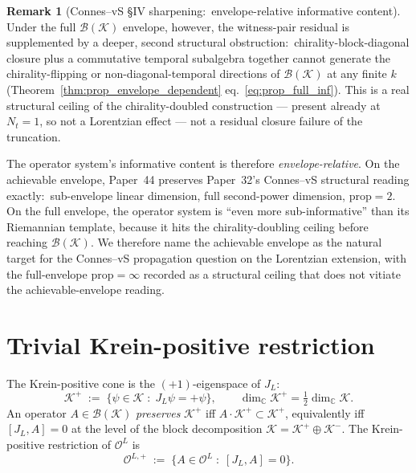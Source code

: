 \documentclass[11pt,a4paper]{article}
\theoremstyle{plain}
\theoremstyle{definition}
\newtheorem{remark}[theorem]{Remark}
\newcommand{\Nt}{N_t}
\newcommand{\Krein}{\mathcal{K}}
\newcommand{\Op}{\mathcal{O}}
\newcommand{\Bcal}{\mathcal{B}}
\newcommand{\C}{\mathbb{C}}
\newcommand{\JL}{J_L}
\newcommand{\prop}{\mathrm{prop}}
\begin{document}
\begin{remark}[Connes--vS \S IV sharpening:\ envelope-relative
informative content]
Under the full $\Bcal(\Krein)$ envelope, however, the witness-pair
residual is supplemented by a deeper, second structural obstruction:\
chirality-block-diagonal closure plus a commutative temporal
subalgebra together cannot generate the chirality-flipping or
non-diagonal-temporal directions of $\Bcal(\Krein)$ at any finite
$k$ (Theorem~\ref{thm:prop_envelope_dependent}
eq.~\eqref{eq:prop_full_inf}). This is a real structural ceiling
of the chirality-doubled construction --- present already at
$\Nt = 1$, so not a Lorentzian effect --- not a residual closure
failure of the truncation.

The operator system's informative content is therefore
\emph{envelope-relative}. On the achievable envelope, Paper~44
preserves Paper~32's Connes--vS structural reading exactly:\
sub-envelope linear dimension, full second-power dimension, $\prop =
2$. On the full envelope, the operator system is ``even more
sub-informative'' than its Riemannian template, because it hits the
chirality-doubling ceiling before reaching $\Bcal(\Krein)$. We
therefore name the achievable envelope as the natural target for the
Connes--vS propagation question on the Lorentzian extension, with
the full-envelope $\prop = \infty$ recorded as a structural ceiling
that does not vitiate the achievable-envelope reading.
\end{remark}

\section{Trivial Krein-positive restriction}\label{sec:krein_positivity}

The Krein-positive cone is the $(+1)$-eigenspace of $\JL$:
\begin{equation}\label{eq:krein_plus}
   \Krein^+ \;:=\; \{ \psi \in \Krein \;:\; \JL \psi = +\psi \},
   \qquad \dim_\C \Krein^+ = \tfrac{1}{2} \dim_\C \Krein.
\end{equation}
An operator $A \in \Bcal(\Krein)$ \emph{preserves} $\Krein^+$ iff
$A \cdot \Krein^+ \subset \Krein^+$, equivalently iff
$[\JL, A] = 0$ at the level of the block decomposition
$\Krein = \Krein^+ \oplus \Krein^-$. The Krein-positive
restriction of $\Op^L$ is
\begin{equation}\label{eq:O_L_plus}
   \Op^{L, +} \;:=\; \{ A \in \Op^L \;:\; [\JL, A] = 0 \}.
\end{equation}
\end{document}
